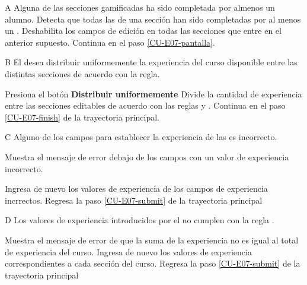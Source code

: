 \begin{UCtrayectoriaA}{A}{%
Alguna de las secciones gamificadas ha sido completada por almenos un alumno.
}
  \Sistema Detecta que todas las  de una sección
           han sido completadas por al menos un .
  \Sistema Deshabilita los campos de edición en todas las secciones que entre
           en el anterior supuesto.
  \Sistema Continua en el paso \ref{CU-E07-pantalla}.
\end{UCtrayectoriaA}

\begin{UCtrayectoriaA}{B}{%
El  desea distribuir uniformemente la experiencia del curso
disponible entre las distintas secciones de acuerdo con la regla.}

  \Actor Presiona el botón {\bf Distribuir uniformemente}
  \Sistema Divide la cantidad de experiencia entre las secciones editables
           de acuerdo con las reglas  y .
  \Sistema Continua en el paso \ref{CU-E07-finish} de la trayectoria principal.
\end{UCtrayectoriaA}

\begin{UCtrayectoriaA}{C}{%
Alguno de los campos para establecer la experiencia de las %
 es incorrecto.}

  \Sistema Muestra el mensaje de error debajo de los campos con un valor de
           experiencia incorrecto.

  \Actor Ingresa de nuevo los valores de experiencia de los campos de experiencia
         incrrectos.
  \Sistema Regresa la paso \ref{CU-E07-submit} de la trayectoria principal
\end{UCtrayectoriaA}

\begin{UCtrayectoriaA}{D}{%
Los valores de experiencia introducidos por el  no cumplen con
la regla .}

  \Sistema Muestra el mensaje de error de que la suma de la experiencia no es igual
           al total de experiencia del curso.
  \Actor Ingresa de nuevo los valores de experiencia correspondientes a cada sección
         del curso.
  \Sistema Regresa la paso \ref{CU-E07-submit} de la trayectoria principal
\end{UCtrayectoriaA}
